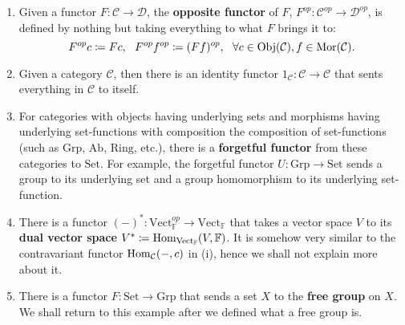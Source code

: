 \begin{example}
\begin{enumerate}[label=(\roman*)]
	\item Given a functor $F:\mathcal{C}\to \mathcal{D}$, the \textbf{opposite functor} of $F$, $F^{op}:\mathcal{C}^{op}\to \mathcal{D}^{op}$, is defined by nothing but taking everything to what $F$ brings it to:
	\[F^{op}c\coloneqq Fc,\ \ F^{op}f^{op}\coloneqq (Ff)^{op},\ \ \forall c\in\Obj(\mathcal{C}), f\in\Mor(\mathcal{C}).\]
	\item Given a category $\mathcal{C}$, then there is an identity functor $1_\mathcal{C}:\mathcal{C}\to\mathcal{C}$ that sents everything in $\mathcal{C}$ to itself.
	\item For categories with objects having underlying sets and morphisms having underlying set-functions with composition the composition of set-functions (such as $\mathrm{Grp}$, $\mathrm{Ab}$, $\mathrm{Ring}$, etc.), there is a \textbf{forgetful functor} from these categories to $\mathrm{Set}$. For example, the forgetful functor $U:\mathrm{Grp}\to \mathrm{Set}$ sends a group to its underlying set and a group homomorphism to its underlying set-function.
	\item There is a functor $(-)^*:\mathrm{Vect}_\mathbb{F}^{op}\to \mathrm{Vect}_\mathbb{F}$ that takes a vector space $V$ to its \textbf{dual vector space} $V^*\coloneqq\operatorname{Hom}_{\mathrm{Vect}_\mathbb{F}}(V,\mathbb{F})$. It is somehow very similar to the contravariant functor $\operatorname{Hom}_\mathcal{C}(-,c)$ in (i), hence we shall not explain more about it.
	\item There is a functor $F:\mathrm{Set}\to \mathrm{Grp}$ that sends a set $X$ to the \textbf{free group} on $X$. We shall return to this example after we defined what a free group is.
	\end{enumerate}
	\end{example}
